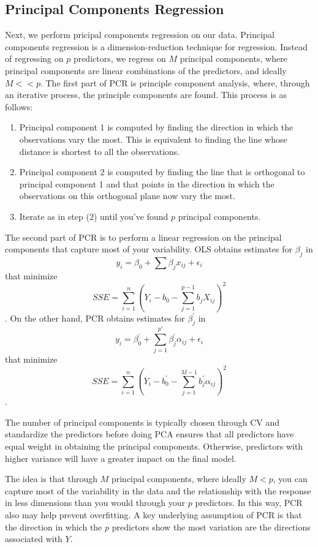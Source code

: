 \documentclass{article}
\begin{document}
\subsection{Principal Components Regression}

Next, we perform pricipal components regression on our data. Principal components regression is a dimension-reduction technique for regression. Instead of regressing on $p$ predictors, we regress on $M$ principal components, where principal components are linear combinations of the predictors, and ideally $M<<p$. The first part of PCR is principle component analysis, where, through an iterative process, the principle components are found. This process is as follows: 

\begin{enumerate}
\item Principal component 1 is computed by finding the direction in which the observations vary the most. This is equivalent to finding the line whose distance is shortest to all the observations. 
\item Principal component 2 is computed by finding the line that is orthogonal to principal component 1 and that points in the direction in which the observations on this orthogonal plane now vary the most. 
\item Iterate as in step (2) until you've found $p$ principal components. 
\end{enumerate}

The second part of PCR is to perform a linear regression on the principal components that capture most of your variability. OLS obtains estimates for $\beta_j$ in $$y_i = \beta_0 + \sum \beta_jx_{ij} + \epsilon_i$$ that minimize $$SSE = \sum_{i=1}^{n}\left(Y_i - b_0 - \sum_{j=1}^{p-1}b_jX_{ij}\right)^2$$. On the other hand, PCR obtains estimates for $\beta_j^\prime$ in $$y_i = \beta_0^\prime + \sum_{j=1}^{p\prime}\beta_j^\prime \alpha_{ij} + \epsilon_i$$ that minimize $$SSE = \sum_{i=1}^{n}\left(Y_i - b_0^\prime - \sum_{j=1}^{M-1}b_j^\prime \alpha_{ij}\right)^2$$.

The number of principal components is typically chosen through CV and standardize the predictors before doing PCA ensures that all predictors have equal weight in obtaining the principal components. Otherwise, predictors with higher variance will have a greater impact on the final model.

The idea is that through $M$ principal components, where ideally $M<p$, you can capture most of the variability in the data and the relationship with the response in less dimensions than you would through your $p$ predictors. In this way, PCR also may help prevent overfitting. A key underlying assumption of PCR is that the direction in which the $p$ predictors show the most variation are the directions associated with $Y$. 
\end{document}
